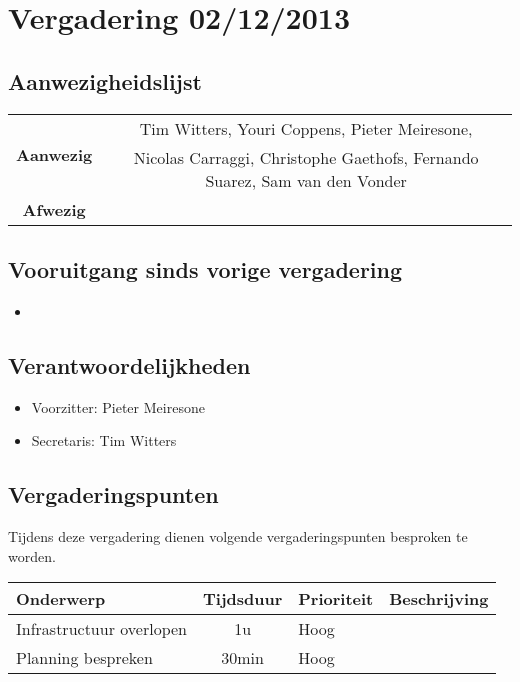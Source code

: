\section{Vergadering 02/12/2013}
\subsection{Aanwezigheidslijst}
\begin{table}[htbp]
	\centering
	\begin{tabular}{c|c}
		\multirow{2}{*}{\textbf{Aanwezig}} & Tim Witters, Youri Coppens, Pieter Meiresone, \\
		& Nicolas Carraggi,  Christophe Gaethofs, Fernando Suarez, Sam van den Vonder \\
		\hline
		\textbf{Afwezig} & \\
	\end{tabular}
\end{table}

\subsection{Vooruitgang sinds vorige vergadering}
\begin{itemize}
	\item 
\end{itemize}

\subsection{Verantwoordelijkheden}
\begin{itemize}
	\item Voorzitter: Pieter Meiresone
	\item Secretaris: Tim Witters
\end{itemize}
\subsection{Vergaderingspunten}

Tijdens deze vergadering dienen volgende vergaderingspunten besproken te worden.
\begin{table} [H]
	\centering
	\begin{tabular} {l|cll}
		\textbf{Onderwerp} & \textbf{Tijdsduur} & \textbf{Prioriteit} & \textbf{Beschrijving} \\ %
		\hline
		Infrastructuur overlopen & 1u & Hoog & \\
		Planning bespreken & 30min & Hoog & \\
	\end{tabular}
\end{table}
